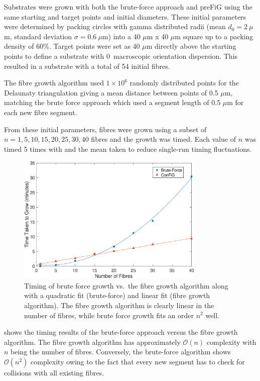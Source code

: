 Substrates were grown with both the brute-force approach and \ac{preFiG} using the same starting and target points and initial diameters.
These initial parameters were determined by packing circles with gamma distributed radii (mean $d_0 = 2\ \mu$m, standard deviation $\sigma = 0.6\ \mu$m) into a 40 $\mu$m x 40 $\mu$m square up to a packing density of 60\%. Target points were set as 40 $\mu$m directly above the starting points to define a substrate with 0\degree\ macroscopic orientation dispersion.
This resulted in a substrate with a total of 54 initial fibres.

The fibre growth algorithm used $1\times 10^6$ randomly distributed points for the Delaunaty triangulation giving a mean distance between points of 0.5 $\mu$m, matching the brute force approach which used a segment length of 0.5 $\mu$m for each new fibre segment.

From these initial parameters, fibres were grown using a subset of $n = 1, 5, 10, 15, 20, 25, 30, 40$ fibres and the growth was timed. Each value of $n$ was timed 5 times with and the mean taken to reduce single-run timing fluctuations.

\begin{figure}[t]
  \centering
  \includegraphics[width=0.8\textwidth]{figures/ipmi_implementation/brute_force_vs_algo_2.eps}
  \caption[Comparison of brute-force growth and proposed fibre growth algorithm]{\small Timing of brute force growth vs.\ the fibre growth algorithm along with a quadratic fit (brute-force) and linear fit (fibre growth algorithm). The fibre growth algorithm is clearly linear in the number of fibres, while brute force growth fits an order $n^2$ well. }
  \label{fig:impi_brute_force}
\end{figure}

 shows the timing results of the brute-force approach versus the fibre growth algorithm.
The fibre growth algorithm  has approximately $\mathcal{O}(n)$ complexity with $n$ being the number of fibres.
Conversely, the brute-force algorithm shows $\mathcal{O}(n^2)$ complexity owing to the fact that every new segment has to check for collisions with all existing fibres.

